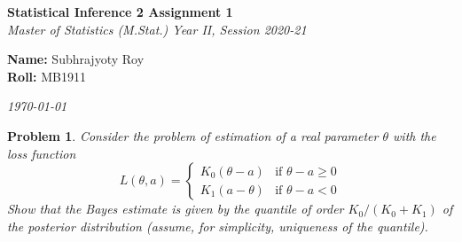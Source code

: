 \documentclass[12pt]{article}
\theoremstyle{problemstyle}
\newtheorem{pbm}{Problem}
\newenvironment{problem}{
\begin{tcolorbox}[colback=green!10!white,colframe=black!75!black, parbox = false]\begin{pbm} }{\end{pbm}\end{tcolorbox} }
\begin{document}
\begin{titlepage}
    \begin{center}
        \vspace*{3cm}
        \Huge{\textbf{Statistical Inference 2 Assignment 1}}\\
        \vspace*{1cm}
        \large{\textit{Master of Statistics (M.Stat.) Year II, Session 2020-21}}\\
        \vspace*{5cm}
        \begin{tcolorbox}[colback=black!5!white,colframe=black!75!black, width = 0.5\linewidth]
            \vspace*{0.5cm}
            \textbf{Name: } Subhrajyoty Roy\\
            \textbf{Roll: } MB1911
            \vspace*{0.5cm}
        \end{tcolorbox}
    \end{center}
    \vspace*{3cm}
    \begin{flushright}
        \large\textit{\today}
    \end{flushright}
\end{titlepage}



\begin{problem}
Consider the problem of estimation of a real parameter $\theta$ with the loss
function
$$L(\theta,a) = \begin{cases}
K_0(\theta-a) & \text{if } \theta-a\geq 0\\
K_1(a-\theta) & \text{if } \theta-a< 0
\end{cases}$$
Show that the Bayes estimate is given by the quantile of order $K_0/(K_0 +
K_1)$ of the posterior distribution (assume, for simplicity, uniqueness of the
quantile).
\end{problem}
\end{document}
